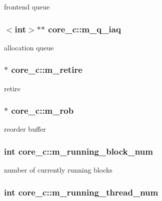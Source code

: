 \label{classcore__c_a0f31904381b06495a98b272fff7e7ac6}
frontend queue \hypertarget{classcore__c_ad0ab47cd7f7b92c21485280a30d9ed60}{
\subsubsection[{m\_\-q\_\-iaq}]{$<$int$>$$\ast$$\ast$ {\bf core\_\-c::m\_\-q\_\-iaq}}}
\label{classcore__c_ad0ab47cd7f7b92c21485280a30d9ed60}
allocation queue \hypertarget{classcore__c_a4dba9e666c600c1447931538b2ea7af9}{
\subsubsection[{m\_\-retire}]{$\ast$ {\bf core\_\-c::m\_\-retire}}}
\label{classcore__c_a4dba9e666c600c1447931538b2ea7af9}
retire \hypertarget{classcore__c_a14662c872c7534776c37e5befffffab3}{
\subsubsection[{m\_\-rob}]{$\ast$ {\bf core\_\-c::m\_\-rob}}}
\label{classcore__c_a14662c872c7534776c37e5befffffab3}
reorder buffer \hypertarget{classcore__c_a6932b52cf2dc0a9c642aaf4177c365d6}{
\subsubsection[{m\_\-running\_\-block\_\-num}]{\setlength{\rightskip}{0pt plus 5cm}int {\bf core\_\-c::m\_\-running\_\-block\_\-num}}}
\label{classcore__c_a6932b52cf2dc0a9c642aaf4177c365d6}
number of currently running blocks \hypertarget{classcore__c_a5abf4a988618cbe68a5aea86ca161530}{
\subsubsection[{m\_\-running\_\-thread\_\-num}]{\setlength{\rightskip}{0pt plus 5cm}int {\bf core\_\-c::m\_\-running\_\-thread\_\-num}}}
